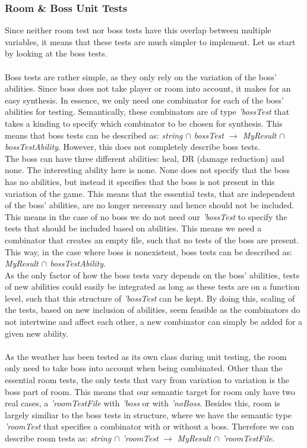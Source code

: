 \subsubsection{Room \& Boss Unit Tests}
Since neither room test nor boss tests have this overlap between multiple variables, it means that these tests are much simpler to implement. Let us start by looking at the boss tests. \\
\\
Boss tests are rather simple, as they only rely on the variation of the boss' abilities. Since boss does not take player or room into account, it makes for an easy synthesis. In essence, we only need one combinator for each of the boss' abilities for testing. Semantically, these combinators are of type \textit{'bossTest} that takes a kinding to specify which combinator to be chosen for synthesis. This means that boss tests can be described as: \textit{string $\cap$ bossTest $\to$ MyResult $\cap$ bossTestAbility}. However, this does not completely describe boss tests. \\
The boss can have three different abilities: heal, DR (damage reduction) and none. The interesting ability here is none. None does not specify that the boss has no abilities, but instead it specifies that the boss is not present in this variation of the game. This means that the essential tests, that are independent of the boss' abilities, are no longer necessary and hence should not be included. This means in the case of no boss we do not need our \textit{'bossTest} to specify the tests that should be included based on abilities. This means we need a combinator that creates an empty file, such that no tests of the boss are present. This way, in the case where boss is nonexistent, boss tests can be described as: \textit{MyResult $\cap$ bossTestAbility}.  \\
As the only factor of how the boss tests vary depends on the boss' abilities, tests of new abilities could easily be integrated as long as these tests are on a function level, such that this structure of \textit{'bossTest} can be kept. By doing this, scaling of the tests, based on new inclusion of abilities, seem feasible as the combinators do not intertwine and affect each other, a new combinator can simply be added for a given new ability. %
\\ \\
As the weather has been tested as its own class during unit testing, the room only need to take boss into account when being combinated. Other than the essential room tests, the only tests that vary from variation to variation is the boss part of room. This means that our semantic target for room only have two real cases, a \textit{'roomTestFile} with \textit{'boss} or with \textit{'noBoss}. Besides this, room is largely similiar to the boss tests in structure, where we have the semantic type \textit{'roomTest} that specifies a combinator with or without a boss. Therefore we can describe room tests as: \textit{string $\cap$ 'roomTest $\to$ MyResult $\cap$ 'roomTestFile}. 